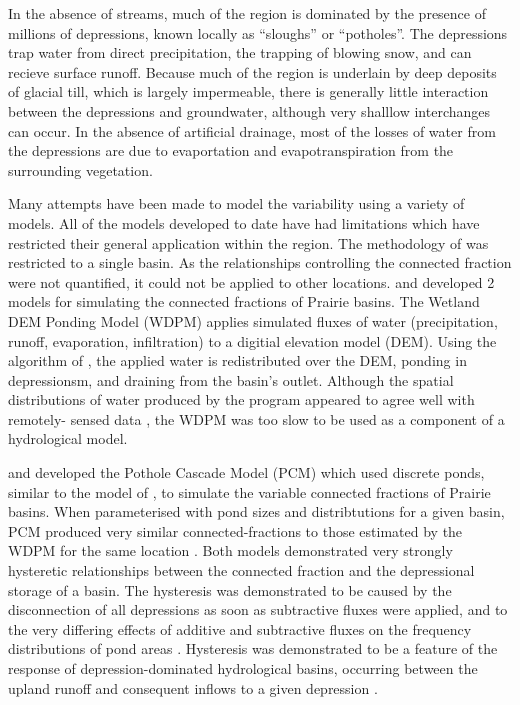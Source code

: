 \documentclass[draft,linenumbers]{agujournal2018}
\begin{document}
In the absence of streams, much of the region is dominated by the
presence of millions of depressions, known locally as ``sloughs'' or
``potholes''. The depressions trap water from direct precipitation, the
trapping of blowing snow, and can recieve surface runoff. Because much
of the region is underlain by deep deposits of glacial till, which is
largely impermeable, there is generally little interaction between the
depressions and groundwater, although very shalllow interchanges can
occur. In the absence of artificial drainage, most of the losses of
water from the depressions are due to evaportation and
evapotranspiration from the surrounding vegetation.

Many attempts have been made to model the variability using a variety of
models. All of the models developed to date have had limitations which
have restricted their general application within the region. The
methodology of \citep{shawTopographicAnalysisPrairie2012} was restricted
to a single basin. As the relationships controlling the connected
fraction were not quantified, it could not be applied to other
locations. \citet{shookMemoryEffectsDepressional2011} and
\citet{shookStorageDynamicsSimulations2013} developed 2 models for
simulating the connected fractions of Prairie basins. The Wetland DEM
Ponding Model (WDPM) applies simulated fluxes of water (precipitation,
runoff, evaporation, infiltration) to a digitial elevation model (DEM).
Using the algorithm of \citet{shapiroMAPCALCAlgebraGIS1992}, the applied
water is redistributed over the DEM, ponding in depressionsm, and
draining from the basin's outlet. Although the spatial distributions of
water produced by the program appeared to agree well with remotely-
sensed data
\citep{armstrongUSINGWETLANDPONDING2013a, shookStorageDynamicsSimulations2013},
the WDPM was too slow to be used as a component of a hydrological model.

\citet{shookMemoryEffectsDepressional2011} and
\citet{shookStorageDynamicsSimulations2013} developed the Pothole
Cascade Model (PCM) which used discrete ponds, similar to the model of
\citet{shawInfluenceContributingArea2009}, to simulate the variable
connected fractions of Prairie basins. When parameterised with pond
sizes and distribtutions for a given basin, PCM produced very similar
connected-fractions to those estimated by the WDPM for the same location
\citep{shookStorageDynamicsSimulations2013}. Both models demonstrated
very strongly hysteretic relationships between the connected fraction
and the depressional storage of a basin. The hysteresis was demonstrated
to be caused by the disconnection of all depressions as soon as
subtractive fluxes were applied, and to the very differing effects of
additive and subtractive fluxes on the frequency distributions of pond
areas \citep{shookStorageDynamicsSimulations2013}. Hysteresis was
demonstrated to be a feature of the response of depression-dominated
hydrological basins, occurring between the upland runoff and consequent
inflows to a given depression
\citep{shookTransformationFrequencyDistributions2015}.
\end{document}
